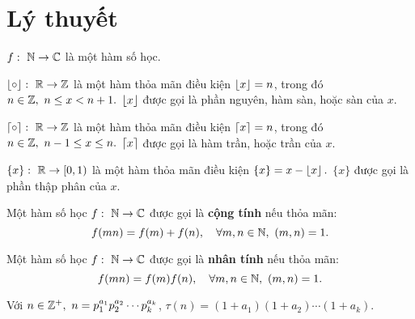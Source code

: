 \documentclass[../../imo-training-open-book.tex]{subfiles}
\begin{document}
\section{Lý thuyết}

\begin{definition*}
    \label{definition:arithmetic-function}
    $f:\ \mathbb N \to \mathbb C$ là một hàm số học.
\end{definition*}

\begin{definition*}
    \label{definition:floor}
    $\left\lfloor \circ \right\rfloor:\ \mathbb R \rightarrow \mathbb Z$ là một hàm thỏa mãn điều kiện $\left\lfloor x \right\rfloor = n$, trong đó $n \in \mathbb Z,\ n \leq x < n+1.$
    $\left\lfloor x \right\rfloor$ được gọi là phần nguyên, hàm sàn, hoặc sàn của $x$. 
\end{definition*}

\begin{definition*}
    \label{definition:ceiling}
    $\left\lceil \circ \right\rceil:\ \mathbb R \rightarrow \mathbb Z$ là một hàm thỏa mãn điều kiện $\left\lceil x \right\rceil = n$, trong đó $n \in \mathbb Z,\ n-1 \leq x \leq n.$
    $\left\lceil x \right\rceil$ được gọi là hàm trần, hoặc trần của $x$.
\end{definition*}

\begin{definition*}
    \label{definition:fractional}
    $\{ x \}:\ \mathbb R \rightarrow [0,1)$ là một hàm thỏa mãn điều kiện $\{x\} = x - \left\lfloor x \right\rfloor.$
    $\{x\}$ được gọi là phần thập phân của $x$.
\end{definition*}

\begin{definition*}
    \label{definition:additive-function}
    Một hàm số học \( f:\ \mathbb N \to \mathbb C \) được gọi là \textbf{cộng tính} nếu thỏa mãn:
    \[
        f(mn) = f(m) + f(n),\quad \forall m,n \in \mathbb N,\ (m,n)=1.
    \]
\end{definition*}

\begin{definition*}
    \label{definition:multiplicative-function}
    Một hàm số học \( f:\ \mathbb N \to \mathbb C \) được gọi là \textbf{nhân tính} nếu thỏa mãn:
    \[
        f(mn) = f(m)f(n),\quad \forall m,n \in \mathbb N,\ (m,n)=1.
    \]
\end{definition*}

\begin{definition*}
    \label{definition:tau-function}
    Với $n \in \mathbb Z^{+},\ n=p_1^{a_1}p_2^{a_2} \cdots p_k^{a_k}$, $\tau(n) = (1+a_1)(1+a_2) \cdots (1+a_k).$
\end{definition*}
\end{document}
